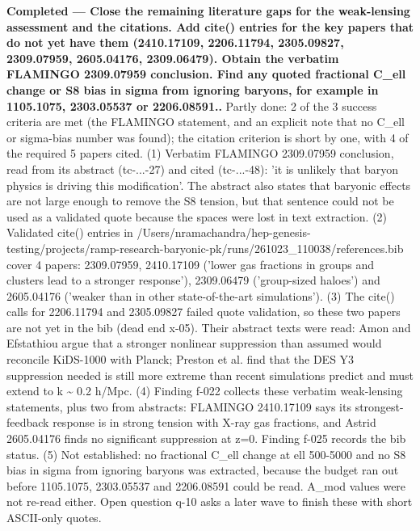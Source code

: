 \documentclass[11pt,a4paper]{article}
\begin{document}
\textbf{Completed --- Close the remaining literature gaps for the weak-lensing assessment and the citations. Add cite() entries for the key papers that do not yet have them (2410.17109, 2206.11794, 2305.09827, 2309.07959, 2605.04176, 2309.06479). Obtain the verbatim FLAMINGO 2309.07959 conclusion. Find any quoted fractional C\_ell change or S8 bias in sigma from ignoring baryons, for example in 1105.1075, 2303.05537 or 2206.08591..} Partly done: 2 of the 3 success criteria are met (the FLAMINGO statement, and an explicit note that no C\_ell or sigma-bias number was found); the citation criterion is short by one, with 4 of the required 5 papers cited. (1) Verbatim FLAMINGO 2309.07959 conclusion, read from its abstract (tc-...-27) and cited (tc-...-48): 'it is unlikely that baryon physics is driving this modification'. The abstract also states that baryonic effects are not large enough to remove the S8 tension, but that sentence could not be used as a validated quote because the spaces were lost in text extraction. (2) Validated cite() entries in /Users/nramachandra/hep-genesis-testing/projects/ramp-research-baryonic-pk/runs/261023\_110038/references.bib cover 4 papers: 2309.07959, 2410.17109 ('lower gas fractions in groups and clusters lead to a stronger response'), 2309.06479 ('group-sized haloes') and 2605.04176 ('weaker than in other state-of-the-art simulations'). (3) The cite() calls for 2206.11794 and 2305.09827 failed quote validation, so these two papers are not yet in the bib (dead end x-05). Their abstract texts were read: Amon and Efstathiou argue that a stronger nonlinear suppression than assumed would reconcile KiDS-1000 with Planck; Preston et al. find that the DES Y3 suppression needed is still more extreme than recent simulations predict and must extend to k \textasciitilde{} 0.2 h/Mpc. (4) Finding f-022 collects these verbatim weak-lensing statements, plus two from abstracts: FLAMINGO 2410.17109 says its strongest-feedback response is in strong tension with X-ray gas fractions, and Astrid 2605.04176 finds no significant suppression at z=0. Finding f-025 records the bib status. (5) Not established: no fractional C\_ell change at ell 500-5000 and no S8 bias in sigma from ignoring baryons was extracted, because the budget ran out before 1105.1075, 2303.05537 and 2206.08591 could be read. A\_mod values were not re-read either. Open question q-10 asks a later wave to finish these with short ASCII-only quotes.
\end{document}
